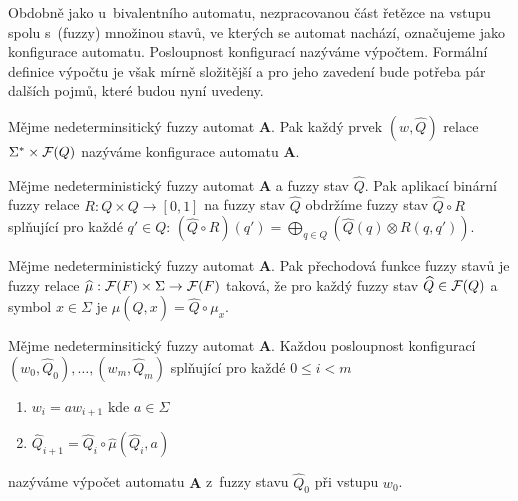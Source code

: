 Obdobně jako u~bivalentního automatu, nezpracovanou část řetězce na vstupu spolu s~(fuzzy) množinou stavů, ve kterých se automat nachází, označujeme jako konfigurace automatu. Posloupnost konfigurací nazýváme výpočtem. Formální definice výpočtu je však mírně složitější a pro jeho zavedení bude potřeba pár dalších pojmů, které budou nyní uvedeny.

\begin{definition}
  Mějme nedeterminsitický fuzzy automat $\mathbf{A}$. Pak každý prvek $(w, \widehat{Q})$ relace $\Sigma^* \times \mathcal{F}(Q)$ nazýváme konfigurace automatu $\mathbf{A}$.
\end{definition}


\begin{definition}
 Mějme nedeterministický fuzzy automat $\mathbf{A}$ a fuzzy stav $\widehat{Q}$. Pak aplikací binární fuzzy relace $R: Q \times Q \rightarrow [0, 1]$ na fuzzy stav $\widehat{Q}$ obdržíme fuzzy stav $\widehat{Q} \circ R$ splňující pro každé $q' \in Q$: $(\widehat{Q} \circ R )(q') = \bigoplus_{q \in Q} (\widehat{Q}(q) \otimes R(q, q'))$.
\end{definition}

\begin{definition}\label{def-PreFunFuzzStav}
 Mějme nedeterministický fuzzy automat $\mathbf{A}$. Pak přechodová funkce fuzzy stavů je fuzzy relace $\widehat{\mu}: \mathcal{F}(F) \times \Sigma \rightarrow \mathcal{F}(F)$ taková, že pro každý fuzzy stav $\widehat{Q} \in \mathcal{F}(Q)$ a symbol $x \in \Sigma$ je $\widehat{\mu}(\widehat{Q}, x) = \widehat{Q} \circ \mu_x$.
\end{definition}

\begin{definition}
  Mějme nedeterminsitický fuzzy automat $\mathbf{A}$. Každou posloupnost konfigurací $(w_0, \widehat{Q}_0), \dots, (w_m, \widehat{Q}_m)$ splňující pro každé $0 \leq i < m$
  \begin{enumerate}
   \item $w_{i} = a w_{i+1}$ kde $a \in \Sigma$
   \item $\widehat{Q}_{i+1} = \widehat{Q}_{i} \circ \widehat{\mu}(\widehat{Q}_{i}, a)$
  \end{enumerate}
  nazýváme výpočet automatu $\mathbf{A}$ z~fuzzy stavu $\widehat{Q}_0$ při vstupu $w_0$.
\end{definition}


